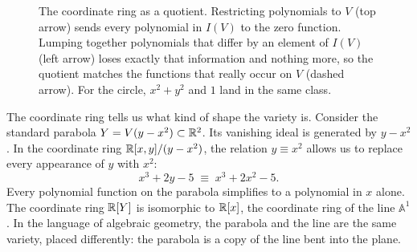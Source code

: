 \begin{figure}[htbp]
\centering
{}
\caption{The coordinate ring as a quotient. Restricting polynomials to $V$ (top arrow) sends every polynomial in $I(V)$ to the zero function. Lumping together polynomials that differ by an element of $I(V)$ (left arrow) loses exactly that information and nothing more, so the quotient matches the functions that really occur on $V$ (dashed arrow). For the circle, $x^2 + y^2$ and $1$ land in the same class.}\label{alggeom:fig-coordinate-ring-triangle}
\end{figure}

The coordinate ring tells us what kind of shape the variety is. Consider the standard parabola $Y = V(y - x^2) \subset \mathbb{R}^2$. Its vanishing ideal is generated by $y - x^2$. In the coordinate ring $\mathbb{R}[x, y]/(y - x^2)$, the relation $y \equiv x^2$ allows us to replace every appearance of $y$ with $x^2$:
\[
x^3 + 2y - 5 \;\equiv\; x^3 + 2x^2 - 5.
\]
Every polynomial function on the parabola simplifies to a polynomial in $x$ alone. The coordinate ring $\mathbb{R}[Y]$ is isomorphic to $\mathbb{R}[x]$, the coordinate ring of the line $\mathbb{A}^1$. In the language of algebraic geometry, the parabola and the line are the same variety, placed differently: the parabola is a copy of the line bent into the plane.


